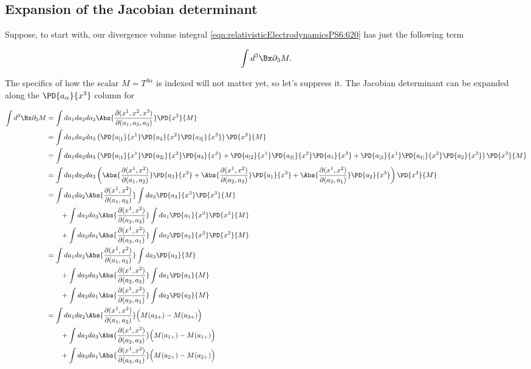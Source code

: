 \subsection{Expansion of the Jacobian determinant}

Suppose, to start with, our divergence volume integral \ref{eqn:relativisticElectrodynamicsPS6:620} has just the following term

\begin{equation}\label{eqn:relativisticElectrodynamicsPS6:520}
\int d^3 \Bx \partial_3 M.
\end{equation}

The specifics of how the scalar $M = T^{3 \alpha}$ is indexed will not matter yet, so let's suppress it.  The Jacobian determinant can be expanded along the $\PD{a_\alpha}{x^3}$ column for

\begin{align*}
\int d^3 \Bx \partial_3 M
&=
\int da_1 da_2 da_3
\Abs{ \frac{\partial(x^1, x^2, x^3)}{\partial (a_1, a_2, a_3)}} 
\PD{x^3}{M} \\
&=
\int da_1 da_2 da_3
\left(
\PD{a_{[1}}{x^1} 
\PD{a_{2}}{x^2} 
\PD{a_{3]}}{x^3} 
\right)
\PD{x^3}{M} \\
&=
\int da_1 da_2 da_3
\left(
\PD{a_{[1}}{x^1} 
\PD{a_{2]}}{x^2} 
\PD{a_{3}}{x^3} 
+
\PD{a_{[2}}{x^1} 
\PD{a_{3]}}{x^2} 
\PD{a_{1}}{x^3} 
+
\PD{a_{[3}}{x^1} 
\PD{a_{1]}}{x^2} 
\PD{a_{2}}{x^3} 
\right)
\PD{x^3}{M} \\
&=
\int da_1 da_2 da_3
\left(
\Abs{ \frac{\partial(x^1, x^2)}{\partial (a_1, a_2)}} 
\PD{a_{3}}{x^3} 
+
\Abs{ \frac{\partial(x^1, x^2)}{\partial (a_2, a_3)}} 
\PD{a_{1}}{x^3} 
+
\Abs{ \frac{\partial(x^1, x^2)}{\partial (a_3, a_1)}} 
\PD{a_{2}}{x^3} 
\right)
\PD{x^3}{M} \\
&=
\int da_1 da_2 \Abs{ \frac{\partial(x^1, x^2)}{\partial (a_1, a_2)}} 
\int da_3 \PD{a_{3}}{x^3} \PD{x^3}{M}  \\
&\qquad +
\int da_2 da_3 \Abs{ \frac{\partial(x^1, x^2)}{\partial (a_2, a_3)}} 
\int da_1 \PD{a_{1}}{x^3} \PD{x^3}{M}  \\
&\qquad +
\int da_3 da_1 \Abs{ \frac{\partial(x^1, x^2)}{\partial (a_3, a_1)}} 
\int da_2 \PD{a_{2}}{x^3} \PD{x^3}{M}  \\
&=
\int da_1 da_2 \Abs{ \frac{\partial(x^1, x^2)}{\partial (a_1, a_2)}} 
\int da_3 \PD{a_{3}}{M}  \\
&\qquad +
\int da_2 da_3 \Abs{ \frac{\partial(x^1, x^2)}{\partial (a_2, a_3)}} 
\int da_1 \PD{a_{1}}{M}  \\
&\qquad +
\int da_3 da_1 \Abs{ \frac{\partial(x^1, x^2)}{\partial (a_3, a_1)}} 
\int da_2 \PD{a_{2}}{M}  \\
&=
\int da_1 da_2 \Abs{ \frac{\partial(x^1, x^2)}{\partial (a_1, a_2)}} 
\Bigl( M(a_{3+}) - M(a_{3+}) \Bigr) \\
&\qquad +
\int da_2 da_3 \Abs{ \frac{\partial(x^1, x^2)}{\partial (a_2, a_3)}} 
\Bigl( M(a_{1+}) - M(a_{1+}) \Bigr) \\
&\qquad +
\int da_3 da_1 \Abs{ \frac{\partial(x^1, x^2)}{\partial (a_3, a_1)}} 
\Bigl( M(a_{2+}) - M(a_{2+}) \Bigr)
\end{align*}

